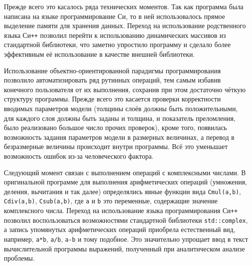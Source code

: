 Прежде всего это касалось ряда технических моментов. Так как программа
была написана на языке программирование Си, то в ней использовалось
прямое выделение памяти для хранения данных.  Переход на использование
родственного языка Си\texttt{++} позволил перейти к использованию
динамических массивов из стандартной библиотеки, что заметно
упростило программу и сделало более эффективным  её использование в качестве
внешней библиотеки. 

Использование объектно-ориентированной парадигмы программирования
позволило автоматизировать ряд рутинных операций, тем самым избавив
конечного пользователя от их выполнения, сохранив при этом достаточно
чёткую структуру программы.  Прежде всего это касается проверки
корректности вводимых параметров модели (толщины слоёв должны быть
положительными, для каждого слоя должны быть заданы и толщина, и
показатель преломления, было реализовано большое число прочих
проверок), кроме того, появилась возможность задания параметров модели
в размерных величинах, а перевод в безразмерные величины происходит
внутри программы. Всё это уменьшает возможность ошибок из-за
человеческого фактора.

Следующий момент связан с выполнением операций с комплексными числами.
В оригинальной программе для выполнения арифметических операций
(умножения, деления, вычитания и так далее) определялись явные
функции вида \verb+Cmul(a,b)+, \verb+Cdiv(a,b)+, \verb+Csub(a,b)+, где
\verb+a+ и \verb+b+ это переменные, содержащие значение комплексного
числа.  Переход на использование языка программирования Си\texttt{++}
позволил воспользоваться возможностями стандартной библиотеки
\verb+std::complex+, а запись упомянутых арифметических операций
приобрела естественный вид, например, \verb!a*b!, \verb!a/b!,
\verb!a-b! и тому подобное.  Это значительно упрощает ввод в текст
вычислительной программы выражений, полученный при аналитическом
анализе проблемы.

